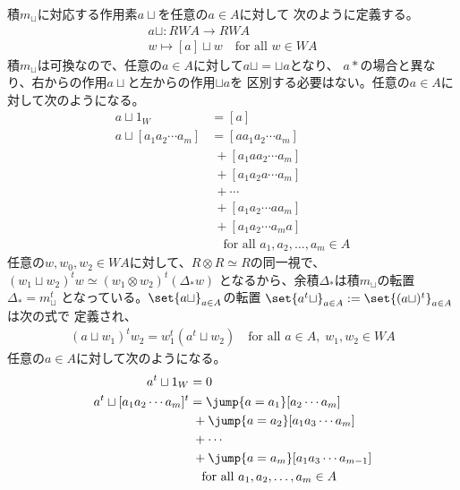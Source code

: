 		積$m_\sqcup$に対応する作用素$a\sqcup$を任意の$a\in A$に対して
		次のように定義する。
		\begin{equation*}\begin{split} %
			a\sqcup: RWA\to RWA \\
			w \mapsto [a]\sqcup w \quad\text{for all }w\in WA 
		\end{split}\end{equation*} %
		積$m_\sqcup$は可換なので、任意の$a\in A$に対して$a\sqcup=\sqcup a$となり、
		$a*$の場合と異なり、右からの作用$a\sqcup$と左からの作用$\sqcup a$を
		区別する必要はない。任意の$a\in A$に対して次のようになる。
		\begin{equation*}\begin{split} %
			a\sqcup 1_W &= [a] \\
			a\sqcup[a_1a_2\cdots a_m] &= [aa_1a_2\cdots a_m] \\
			&\;+ [a_1aa_2\cdots a_m] \\
			&\;+ [a_1a_2a\cdots a_m] \\
			&\; + \cdots \\
			&\;+ [a_1a_2\cdots aa_m] \\
			&\;+ [a_1a_2\cdots a_ma] \\
			&\quad\text{for all }a_1,a_2,\dots,a_m\in A
		\end{split}\end{equation*} %
		任意の$w,w_0,w_2\in WA$に対して、$R\otimes R\simeq R$の同一視で、
		$(w_1\sqcup w_2)^t w\simeq(w_1\otimes w_2)^t(\Delta_* w)$
		となるから、余積$\Delta_*$は積$m_\sqcup$の転置$\Delta_*=m_\sqcup^t$
		となっている。$\set{a\sqcup}_{a\in A}$の転置
		$\set{a^t\sqcup}_{a\in A}:=\set{(a\sqcup)^t}_{a\in A}$は次の式で
		定義され、
		\begin{equation*}\begin{split} %
			(a\sqcup w_1)^tw_2=w_1^t(a^t\sqcup w_2)
			\quad\text{for all }a\in A,\;w_1,w_2\in WA
		\end{split}\end{equation*} %
		任意の$a\in A$に対して次のようになる。
		\begin{equation*}\begin{split} %
			a^t\sqcup 1_W &= 0 \\
			a^t\sqcup [a_1a_2\cdots a_m]^t &= \jump{a=a_1}[a_2\cdots a_m] \\
			&\;+ \jump{a=a_2}[a_1a_3\cdots a_m] \\
			&\;+ \cdots \\
			&\;+ \jump{a=a_m}[a_1a_3\cdots a_{m-1}] \\
			&\quad\text{for all }a_1,a_2,\dots,a_m\in A
		\end{split}\end{equation*} %

